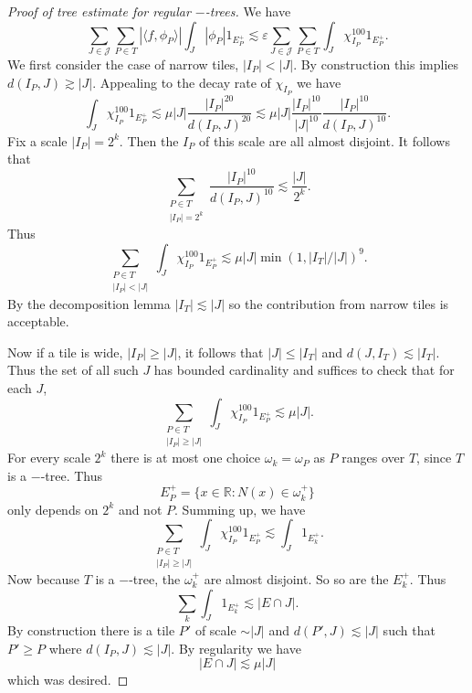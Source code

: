 \documentclass[12pt]{report}
\newcommand{\RR}{\mathbb{R}}
\theoremstyle{definition}
\begin{document}
\begin{proof}[Proof of tree estimate for regular $-$-trees]
We have
$$\sum_{J \in \mathcal J} \sum_{P \in T} |\langle f,\phi_P\rangle| \int_J |\phi_P|1_{E_P^+} \lesssim \varepsilon \sum_{J \in \mathcal J} \sum_{P \in T} \int_J \chi_{I_P}^{100}1_{E_P^+}.$$
We first consider the case of narrow tiles, $|I_P| < |J|$. By construction this implies $d(I_P, J) \gtrsim |J|$.
Appealing to the decay rate of $\chi_{I_P}$ we have
$$\int_J \chi_{I_P}^{100}1_{E_P^+} \lesssim \mu|J|\frac{|I_P|^{20}}{d(I_P,J)^{20}} \lesssim \mu|J|\frac{|I_P|^{10}}{|J|^{10}}\frac{|I_P|^{10}}{d(I_P, J)^{10}}.$$
Fix a scale $|I_P| = 2^k$. Then the $I_P$ of this scale are all almost disjoint. It follows that
$$\sum_{\substack{P \in T\\|I_P| = 2^k}} \frac{|I_P|^{10}}{d(I_P, J)^{10}} \lesssim \frac{|J|}{2^k}.$$
Thus
$$\sum_{\substack{P \in T\\|I_P| < |J|}} \int_J \chi_{I_P}^{100}1_{E_P^+} \lesssim \mu|J| \min(1, |I_T|/|J|)^9.$$
By the decomposition lemma $|I_T| \lesssim |J|$ so the contribution from narrow tiles is acceptable.

Now if a tile is wide, $|I_P| \geq |J|$, it follows that $|J| \leq |I_T|$ and $d(J, I_T) \lesssim |I_T|$.
Thus the set of all such $J$ has bounded cardinality and suffices to check that for each $J$,
$$\sum_{\substack{P \in T\\|I_P| \geq |J|}} \int_J \chi_{I_P}^{100} 1_{E_P^+} \lesssim \mu|J|.$$
For every scale $2^k$ there is at most one choice $\omega_k = \omega_P$ as $P$ ranges over $T$, since $T$ is a $-$-tree. Thus
$$E_P^+ = \{x \in \RR: N(x) \in \omega_k^+\}$$
only depends on $2^k$ and not $P$.
Summing up, we have
$$\sum_{\substack{P \in T\\|I_P| \geq |J|}} \int_J \chi_{I_P}^{100}1_{E_P^+} \lesssim \int_J 1_{E_k^+}.$$
Now because $T$ is a $-$-tree, the $\omega_k^+$ are almost disjoint. So so are the $E_k^+$. Thus
$$\sum_k \int_J 1_{E_k^+} \lesssim |E \cap J|.$$
By construction there is a tile $P'$ of scale $\sim |J|$ and $d(P', J) \lesssim |J|$ such that $P' \geq P$ where $d(I_P, J) \lesssim |J|$.
By regularity we have
$$|E \cap J| \lesssim \mu|J|$$
which was desired.
\end{proof}
\end{document}
